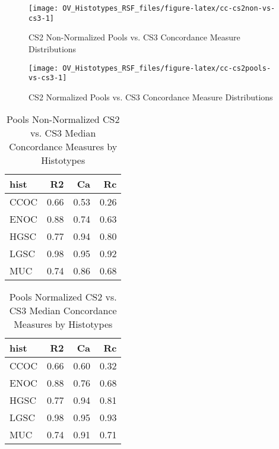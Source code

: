 \documentclass[
]{report}
\begin{document}
\begin{figure}[H]

{\centering \texttt{[image: OV\_Histotypes\_RSF\_files/figure-latex/cc-cs2non-vs-cs3-1]} 

}

\caption{CS2 Non-Normalized Pools vs. CS3 Concordance Measure Distributions}\label{fig:cc-cs2non-vs-cs3}
\end{figure}

\begin{figure}[H]

{\centering \texttt{[image: OV\_Histotypes\_RSF\_files/figure-latex/cc-cs2pools-vs-cs3-1]} 

}

\caption{CS2 Normalized Pools vs. CS3 Concordance Measure Distributions}\label{fig:cc-cs2pools-vs-cs3}
\end{figure}

\begin{table}

\caption{\label{tab:pools-cs2non-vs-cs3}Pools Non-Normalized CS2 vs. CS3 Median Concordance Measures by Histotypes}
\centering
\begin{tabular}[t]{l|r|r|r}
\hline
hist & R2 & Ca & Rc\\
\hline
CCOC & 0.66 & 0.53 & 0.26\\
\hline
ENOC & 0.88 & 0.74 & 0.63\\
\hline
HGSC & 0.77 & 0.94 & 0.80\\
\hline
LGSC & 0.98 & 0.95 & 0.92\\
\hline
MUC & 0.74 & 0.86 & 0.68\\
\hline
\end{tabular}
\end{table}

\begin{table}

\caption{\label{tab:pools-cs2norm-vs-cs3}Pools Normalized CS2 vs. CS3 Median Concordance Measures by Histotypes}
\centering
\begin{tabular}[t]{l|r|r|r}
\hline
hist & R2 & Ca & Rc\\
\hline
CCOC & 0.66 & 0.60 & 0.32\\
\hline
ENOC & 0.88 & 0.76 & 0.68\\
\hline
HGSC & 0.77 & 0.94 & 0.81\\
\hline
LGSC & 0.98 & 0.95 & 0.93\\
\hline
MUC & 0.74 & 0.91 & 0.71\\
\hline
\end{tabular}
\end{table}
\end{document}
